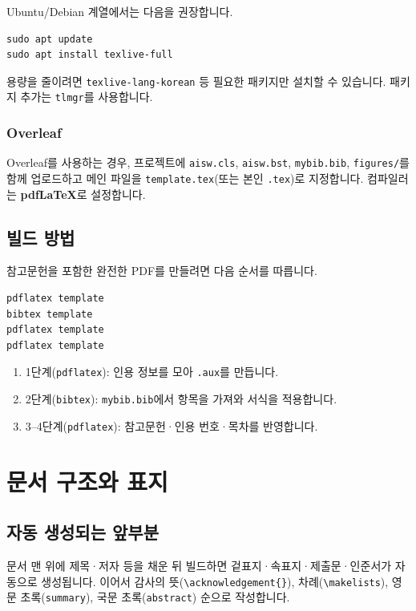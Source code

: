 \documentclass[korean]{aisw}
\begin{document}
Ubuntu/Debian 계열에서는 다음을 권장합니다.
\begin{verbatim}
sudo apt update
sudo apt install texlive-full
\end{verbatim}
용량을 줄이려면 \texttt{texlive-lang-korean} 등 필요한 패키지만 설치할 수 있습니다.
패키지 추가는 \texttt{tlmgr}를 사용합니다.

\subsection{Overleaf}

Overleaf를 사용하는 경우, 프로젝트에 \texttt{aisw.cls}, \texttt{aisw.bst},
\texttt{mybib.bib}, \texttt{figures/}를 함께 업로드하고
메인 파일을 \texttt{template.tex}(또는 본인 \texttt{.tex})로 지정합니다.
컴파일러는 \textbf{pdfLaTeX}로 설정합니다.

\section{빌드 방법}

참고문헌을 포함한 완전한 PDF를 만들려면 다음 순서를 따릅니다.

\begin{verbatim}
pdflatex template
bibtex template
pdflatex template
pdflatex template
\end{verbatim}

\begin{enumerate}
    \item 1단계(\texttt{pdflatex}): 인용 정보를 모아 \texttt{.aux}를 만듭니다.
    \item 2단계(\texttt{bibtex}): \texttt{mybib.bib}에서 항목을 가져와 서식을 적용합니다.
    \item 3--4단계(\texttt{pdflatex}): 참고문헌·인용 번호·목차를 반영합니다.
\end{enumerate}

\chapter{문서 구조와 표지}

\section{자동 생성되는 앞부분}

문서 맨 위에 제목·저자 등을 채운 뒤 빌드하면
겉표지·속표지·제출문·인준서가 자동으로 생성됩니다.
이어서 감사의 뜻(\texttt{\textbackslash acknowledgement\{\}}),
차례(\texttt{\textbackslash makelists}),
영문 초록(\texttt{summary}), 국문 초록(\texttt{abstract}) 순으로 작성합니다.
\end{document}
